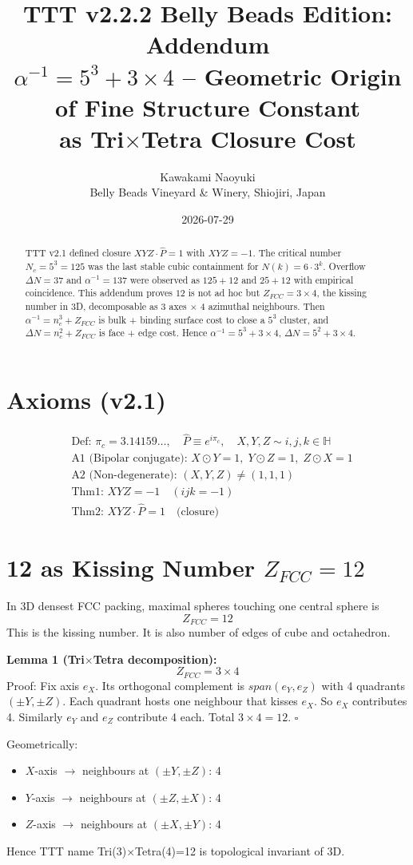 \documentclass[a4paper,11pt]{article}
\title{TTT v2.2.2 Belly Beads Edition: Addendum\\
$\alpha^{-1}=5^{3}+3\times4$ -- Geometric Origin of Fine Structure Constant\\
as Tri$\times$Tetra Closure Cost}
\author{Kawakami Naoyuki\\ Belly Beads Vineyard \& Winery, Shiojiri, Japan}
\date{2026-07-29}
\begin{document}
\maketitle

\begin{abstract}
TTT v2.1 defined closure $XYZ\cdot\hat{P}=1$ with $XYZ=-1$. The critical number $N_c=5^3=125$ was the last stable cubic containment for $N(k)=6\cdot3^k$. Overflow $\Delta N=37$ and $\alpha^{-1}=137$ were observed as $125+12$ and $25+12$ with empirical coincidence. This addendum proves $12$ is not ad hoc but $Z_{FCC}=3\times4$, the kissing number in 3D, decomposable as 3 axes $\times$ 4 azimuthal neighbours. Then $\alpha^{-1}=n_c^3+Z_{FCC}$ is bulk + binding surface cost to close a $5^3$ cluster, and $\Delta N = n_c^2+Z_{FCC}$ is face + edge cost. Hence $\alpha^{-1}=5^3+3\times4$, $\Delta N=5^2+3\times4$.
\end{abstract}

\section{Axioms (v2.1)}
\begin{align*}
&\text{Def: } \pi_c=3.14159\ldots,\quad \hat{P}\equiv e^{i\pi_c},\quad X,Y,Z\sim i,j,k\in\mathbb{H}\\
&\text{A1 (Bipolar conjugate): } X\odot Y=1,\;Y\odot Z=1,\;Z\odot X=1\\
&\text{A2 (Non-degenerate): } (X,Y,Z)\neq(1,1,1)\\
&\text{Thm1: } XYZ=-1 \quad (ijk=-1)\\
&\text{Thm2: } XYZ\cdot\hat{P}=1 \quad \text{(closure)}
\end{align*}

\section{12 as Kissing Number $Z_{FCC}=12$}
In 3D densest FCC packing, maximal spheres touching one central sphere is
$$Z_{FCC}=12$$
This is the kissing number. It is also number of edges of cube and octahedron.

\textbf{Lemma 1 (Tri$\times$Tetra decomposition):}
$$Z_{FCC}=3\times4$$
Proof: Fix axis $e_X$. Its orthogonal complement is $span(e_Y,e_Z)$ with 4 quadrants $(\pm Y,\pm Z)$. Each quadrant hosts one neighbour that kisses $e_X$. So $e_X$ contributes 4. Similarly $e_Y$ and $e_Z$ contribute 4 each. Total $3\times4=12$. $\square$

Geometrically:
\begin{itemize}
\item $X$-axis $\to$ neighbours at $(\pm Y, \pm Z)$: 4
\item $Y$-axis $\to$ neighbours at $(\pm Z, \pm X)$: 4
\item $Z$-axis $\to$ neighbours at $(\pm X, \pm Y)$: 4
\end{itemize}
Hence TTT name Tri(3)$\times$Tetra(4)=12 is topological invariant of 3D.
\end{document}
